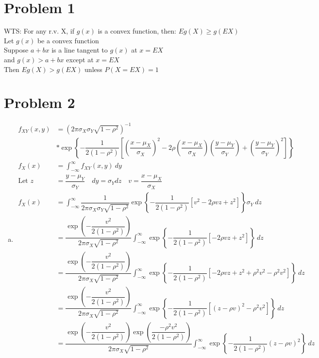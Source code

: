 \documentclass{article}
\begin{document}
\begin{flushleft}
\section*{Problem 1}
WTS: For any r.v. X, if $g(x)$ is a convex function, then: $Eg(X)\geq g(EX)$\\
Let $g(x)$ be a convex function\\
Suppose $a+bx$ is a line tangent to $g(x)$ at $x=EX$\\
and $g(x)>a+bx$ except at $x=EX$\\
Then $Eg(X)>g(EX)$ unless $P(X=EX)=1$\\
\section*{Problem 2}
\begin{enumerate}[(a)]
\item 
\begin{align*}
f_{XY}(x,y)&=\left(2\pi \sigma_X \sigma_Y \sqrt{1-\rho^2} \right)^{-1}\\
&*\exp{\left\{-\dfrac{1}{2(1-\rho^2)}\left[\left(\dfrac{x-\mu_X}{\sigma_X} \right)^2- 2\rho \left(\dfrac{x-\mu_X}{\sigma_X} \right)\left(\dfrac{y-\mu_Y}{\sigma_Y} \right)+\left(\dfrac{y-\mu_Y}{\sigma_Y} \right)^2 \right] \right\}}\\
f_X(x)&=\int_{-\infty}^{\infty}f_{XY}(x,y) \ dy\\
\text{Let } z&=\dfrac{y-\mu_Y}{\sigma_Y} \quad dy=\sigma_Y dz \quad v=\dfrac{x-\mu_X}{\sigma_X}\\
f_X(x)&=\int_{-\infty}^{\infty}\dfrac{1}{2\pi \sigma_X \sigma_Y \sqrt{1-\rho^2}}\exp{\left\{-\dfrac{1}{2(1-\rho^2)}\left[v^2-2\rho vz+z^2  \right] \right\}}\sigma_Y \ dz\\
&=\dfrac{\exp{ \left(-\dfrac{v^2}{2(1-\rho^2)}\right)}}{2\pi \sigma_X \sqrt{1-\rho^2}}\int_{-\infty}^{\infty}\exp{\left\{-\dfrac{1}{2(1-\rho^2)}\left[-2\rho vz+z^2  \right] \right\}} \ dz\\
&=\dfrac{\exp{ \left(-\dfrac{v^2}{2(1-\rho^2)}\right)}}{2\pi \sigma_X \sqrt{1-\rho^2}}\int_{-\infty}^{\infty}\exp{\left\{-\dfrac{1}{2(1-\rho^2)}\left[-2\rho vz+z^2+\rho^2v^2-\rho^2v^2  \right] \right\}} \ dz\\
&=\dfrac{\exp{ \left(-\dfrac{v^2}{2(1-\rho^2)}\right)}}{2\pi \sigma_X \sqrt{1-\rho^2}}\int_{-\infty}^{\infty}\exp{\left\{-\dfrac{1}{2(1-\rho^2)}\left[(z-\rho v)^2-\rho^2 v^2 \right] \right\}} \ dz\\
&=\dfrac{\exp{ \left(-\dfrac{v^2}{2(1-\rho^2)}\right)}\exp{ \left(\dfrac{-\rho^2 v^2}{2(1-\rho^2)}\right)}}{2\pi \sigma_X \sqrt{1-\rho^2}}\int_{-\infty}^{\infty}\exp{\left\{-\dfrac{1}{2(1-\rho^2)}(z-\rho v)^2 \right\}} \ dz\\

\end{align*}
\end{enumerate}
\end{flushleft}
\end{document}
